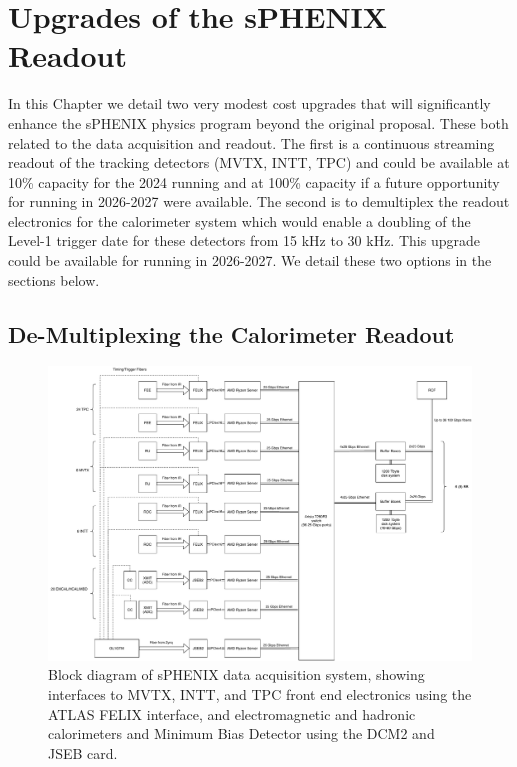 \chapter{Upgrades of the sPHENIX Readout}
\label{chap:readout}

In this Chapter we detail two very modest cost upgrades that will significantly enhance the sPHENIX physics program beyond the original proposal.     These both related to the data acquisition and readout.   The first is a continuous streaming readout of the tracking detectors (MVTX, INTT, TPC) and could be available at 10\% capacity for the 2024 running and at 100\% capacity if a future opportunity for running in 2026-2027 were available.   The second is to demultiplex the readout electronics for the calorimeter system which would enable a doubling of the Level-1 trigger date for these detectors from 15 kHz to 30 kHz.   This upgrade could be available for running in 2026-2027.   We detail these two options in the sections below.



\section{De-Multiplexing the Calorimeter Readout}
\label{sec:streaming_readout}

\begin{figure}
    \centering
    \includegraphics[width=0.75\linewidth]{figs/sphenixdaq_servers_20200803.pdf}
    \caption{Block diagram of sPHENIX data acquisition system, showing interfaces to MVTX, INTT, and TPC front end electronics using the ATLAS FELIX interface, and electromagnetic and hadronic calorimeters and Minimum Bias Detector using the DCM2 and JSEB card.}
    \label{fig:sphenixdaq_servers}
\end{figure}

